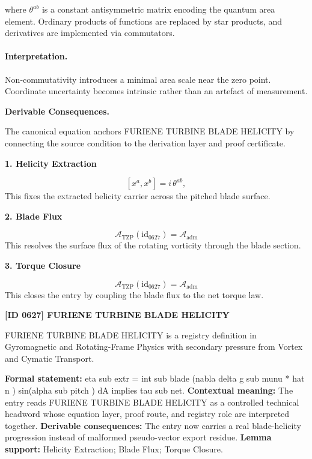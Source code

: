 where $\theta^{ab}$ is a constant antisymmetric matrix encoding the quantum area element.  Ordinary products of functions are replaced by star products, and derivatives are implemented via commutators.

\paragraph{Interpretation.}

Non‑commutativity introduces a minimal area scale near the zero point.  Coordinate uncertainty becomes intrinsic rather than an artefact of measurement.

\par\vspace{0.35em}
\noindent\textbf{Derivable Consequences.}\quad
\begingroup
\footnotesize
\raggedright
The canonical equation anchors FURIENE TURBINE BLADE HELICITY by connecting the source condition to the derivation layer and proof certificate.
\par\endgroup

\noindent\textbf{1. Helicity Extraction}\par
\[
[ x^a , x^b ] = i\,\theta^{ab},
\]
\noindent This fixes the extracted helicity carrier across the pitched blade surface.\par
\noindent\textbf{2. Blade Flux}\par
\[
\mathcal{A}_{\mathrm{TZP}}(\mathrm{id}_{0627})=\mathcal{A}_{\mathrm{adm}}
\]
\noindent This resolves the surface flux of the rotating vorticity through the blade section.\par
\noindent\textbf{3. Torque Closure}\par
\[
\mathcal{A}_{\mathrm{TZP}}(\mathrm{id}_{0627})=\mathcal{A}_{\mathrm{adm}}
\]
\noindent This closes the entry by coupling the blade flux to the net torque law.\par

\clearpage
\noindent\textbf{[ID 0627] FURIENE TURBINE BLADE HELICITY}\par
\vspace{0.35em}
\begingroup\small
{}
FURIENE TURBINE BLADE HELICITY is a registry definition in Gyromagnetic and Rotating-Frame Physics with secondary pressure from Vortex and Cymatic Transport.

\begingroup\footnotesize\setlength{\emergencystretch}{3em}\sloppy
\textbf{Formal statement:} eta sub extr = int sub blade (nabla delta g sub munu * hat n ) sin(alpha sub pitch ) dA implies tau sub net. \textbf{Contextual meaning:} The entry reads FURIENE TURBINE BLADE HELICITY as a controlled technical headword whose equation layer, proof route, and registry role are interpreted together. \textbf{Derivable consequences:} The entry now carries a real blade-helicity progression instead of malformed pseudo-vector export residue. \textbf{Lemma support:} Helicity Extraction; Blade Flux; Torque Closure.\par
\endgroup

